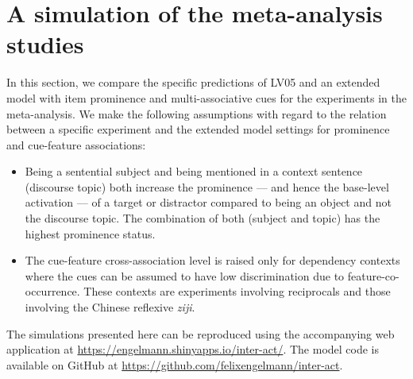 \documentclass{cambridge7A}\usepackage[]{graphicx}\usepackage[]{color}
\begin{document}
\section{A simulation of the meta-analysis studies}
\label{sec:sims}
In this section, we compare the specific predictions of LV05 and an extended model with item prominence and multi-associative cues for the experiments in the \cite{JaegerEngelmannVasishth2017} meta-analysis.
We make the following assumptions with regard to the relation between a specific experiment and the extended model settings for prominence and cue-feature associations:
\begin{itemize}
	\item Being a sentential subject and being mentioned in a  context sentence  (discourse topic) both increase the prominence --- and hence the base-level activation --- of a target or distractor compared to being an object and not the discourse topic. The combination of both (subject and topic) has the highest prominence status.
	\item The cue-feature cross-association level is raised only for dependency contexts where the cues can be assumed to have low discrimination due to feature-co-occurrence. These contexts are experiments involving  reciprocals and those involving the  Chinese reflexive \textit{ziji}. 
\end{itemize}

The simulations presented here can be reproduced using the accompanying web application at \url{https://engelmann.shinyapps.io/inter-act/}.
The model code is available on GitHub at \url{https://github.com/felixengelmann/inter-act}.


\end{document}
